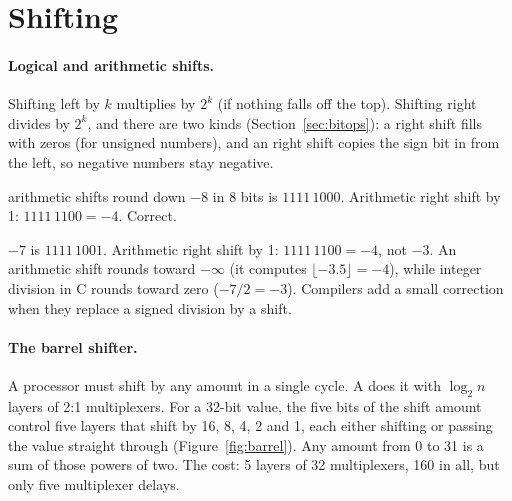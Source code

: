 \section{Shifting}

\paragraph{Logical and arithmetic shifts.} Shifting left by $k$ multiplies by $2^k$ (if nothing falls off the top). Shifting right divides by $2^k$, and there are two kinds (Section~\ref{sec:bitops}): a  right shift fills with zeros (for unsigned numbers), and an  right shift copies the sign bit in from the left, so negative numbers stay negative.

\begin{worked}{arithmetic shifts round down}
$-8$ in 8 bits is $1111\,1000$. Arithmetic right shift by 1: $1111\,1100 = -4$. Correct.

$-7$ is $1111\,1001$. Arithmetic right shift by 1: $1111\,1100 = -4$, not $-3$. An arithmetic shift rounds toward $-\infty$ (it computes $\lfloor -3.5 \rfloor = -4$), while integer division in C rounds toward zero ($-7/2 = -3$). Compilers add a small correction when they replace a signed division by a shift.
\end{worked}

\paragraph{The barrel shifter.} A processor must shift by any amount in a single cycle. A  does it with $\log_2 n$ layers of 2:1 multiplexers. For a 32-bit value, the five bits of the shift amount control five layers that shift by 16, 8, 4, 2 and 1, each either shifting or passing the value straight through (Figure~\ref{fig:barrel}). Any amount from 0 to 31 is a sum of those powers of two. The cost: 5 layers of 32 multiplexers, 160 in all, but only five multiplexer delays.

